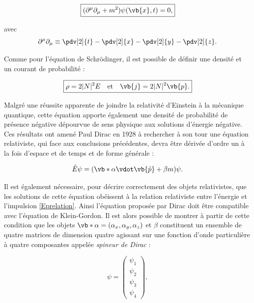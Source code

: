         \begin{equation}
        \boxed{
            (\partial^{\mu}\partial_{\mu}+m^2)\psi(\vb{x},t)=0
        ,}
        \label{KG}
        \end{equation}
        
        avec $$\partial^{\mu}\partial_{\mu}\equiv\pdv[2]{t}-\pdv[2]{x}-\pdv[2]{y}-\pdv[2]{z}.$$
        
        Comme pour l'équation de Schrödinger, il est possible de définir une densité et un courant de probabilité :

        \begin{equation}
        \boxed{
            \rho=2|N|^2E \quad \mbox{et} \quad \vb{j}=2|N|^2\vb{p}.
        }
        \end{equation}
        
        Malgré une réussite apparente de joindre la relativité d'Einstein à la mécanique quantique, cette équation apporte également une densité de probabilité de présence négative dépourvue de sens physique aux solutions d'énergie négative. Ces résultats ont amené Paul Dirac en 1928 à rechercher à son tour une équation relativiste, qui face aux conclusions précédentes, devra être dérivée d'ordre un à la fois d'espace et de temps et de forme générale :
        
        \begin{equation}
            \hat{E}\psi=(\vb*{\alpha}\vdot\vb{\hat{p}}+\beta m)\psi.
            \label{dirac1}
        \end{equation}
        
        Il est également nécessaire, pour décrire correctement des objets relativistes, que les solutions de cette équation obéissent à la relation relativiste entre l'énergie et l'impulsion \ref{Eprelation}. Ainsi l'équation proposée par Dirac doit être compatible avec l'équation de Klein-Gordon. Il est alors possible de montrer à partir de cette condition que les objets $\vb*{\alpha}=(\alpha_x, \alpha_y, \alpha_z)$ et $\beta$ constituent un ensemble de  quatre matrices de dimension quatre agissant sur une fonction d'onde particulière à quatre composantes appelée \textit{spineur de Dirac} :
  
        \[
            \psi = 
            \begin{pmatrix}
                \psi_1 \\
                \psi_2 \\
                \psi_3 \\
                \psi_4
            \end{pmatrix}
        ,\]
        
